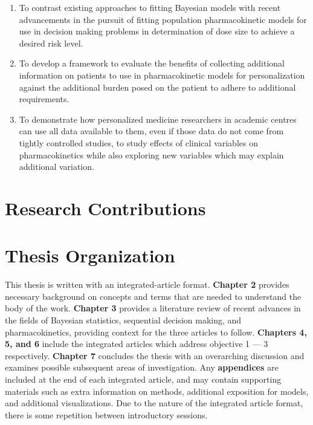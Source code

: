 \begin{enumerate}[1)]
	\item To contrast existing approaches to fitting Bayesian models with recent advancements in the pursuit of fitting population pharmacokinetic models for use in decision making problems in determination of dose size to achieve a desired risk level.
	
	\item To develop a framework to evaluate the  benefits of collecting additional information on patients to use in pharmacokinetic models for personalization against the additional burden posed on the patient to adhere to additional requirements.
	
	\item To demonstrate how personalized medicine researchers in academic centres can use all data available to them, even if those data do not come from tightly controlled studies, to study effects of clinical variables on pharmacokinetics while also exploring new variables which may explain additional variation.
\end{enumerate}


\section{Research Contributions}

\section{Thesis Organization}

This thesis is written with an integrated-article format.  \textbf{Chapter 2} provides necessary background on  concepts and terms that are needed to understand the body of the work.  \textbf{Chapter 3} provides a literature review of recent advances in the fields of Bayesian statistics, sequential decision making, and pharmacokinetics, providing context for the three articles to follow.  \textbf{Chapters 4, 5, and 6} include the integrated articles which address objective 1 --- 3 respectively.  \textbf{Chapter 7} concludes the thesis with an overarching discussion and examines possible subsequent areas of investigation.  Any \textbf{appendices} are included at the end of each integrated article, and may contain supporting materials such as extra information on methods, additional exposition for models, and additional visualizations.  Due to the nature of the integrated article format, there is some repetition between introductory sessions.